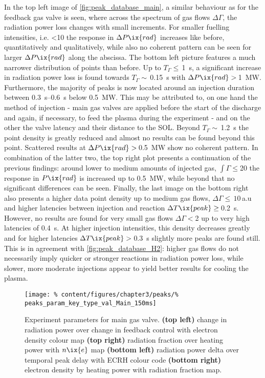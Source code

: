             In the top left image of \cref{fig:peak_database_main}, a similar behaviour as for the feedback gas valve is seen, where across the spectrum of gas flows $\Delta\Gamma$, the radiation power loss changes with small increments. For smaller fuelling intensities, i.e. <\SI{10}{\arbitraryunit} the response in $\Delta P\ix{rad}$ increases like before, quantitatively and qualitatively, while also no coherent pattern can be seen for larger $\Delta P\ix{rad}$ along the abscissa. The bottom left picture features a much narrower distribution of points than before. Up to $T_{\Gamma}\le\,$\SI{1}{\second}, a significant increase in radiation power loss is found towards $T_{\Gamma}\sim\,$\SI{0.15}{\second} with $\Delta P\ix{rad}>\,$\SI{1}{\mega\watt}. Furthermore, the majority of peaks is now located around an injection duration between \SIrange{0.3}{0.6}{\second} below \SI{0.5}{\mega\watt}. This may be attributed to, on one hand the method of injection - main gas valves are applied before the start of the discharge and again, if necessary, to feed the plasma during the experiment - and on the other the valve latency and their distance to the SOL. Beyond $T_{\Gamma}\sim\,$\SI{1.2}{\second} the point density is greatly reduced and almost no results can be found beyond this point. Scattered results at $\Delta P\ix{rad}>\,$\SI{0.5}{\mega\watt} show no coherent pattern. In combination of the latter two, the top right plot presents a continuation of the previous findings: around lower to medium amounts of injected gas, $\int\Gamma\le$\SI{20}{\arbitraryunit} the response in $P\ix{rad}$ is increased up to \SI{0.5}{\mega\watt}, while beyond that no significant differences can be seen. Finally, the last image on the bottom right also presents a higher data point density up to medium gas flows, $\Delta\Gamma\le\,10\,$a.u and higher latencies between injection and reaction $\Delta T\ix{peak}\ge\,$\SI{0.2}{\second}. However, no results are found for very small gas flows $\Delta\Gamma<$\SI{2}{\arbitraryunit} up to very high latencies of \SI{0.4}{\second}. At higher injection intensities, this density decreases greatly and for higher latencies $\Delta T\ix{peak}>\,$\SI{0.3}{\second} slightly more peaks are found still. This is in agreement with \cref{fig:peak_database_H2}: higher gas flows do not necessarily imply quicker or stronger reactions in radiation power loss, while slower, more moderate injections appear to yield better results for cooling the plasma.\\%
%
            \begin{figure}[t]%
                \centering%
                \texttt{[image: \%
                    content/figures/chapter3/peaks/\%
                    peaks\_param\_key\_type\_val\_Main\_150ms]}%
                \caption{Experiment parameters for main gas valve. \textbf{(top left)} change in radiation power over change in feedback control with electron density colour map \textbf{(top right)} radiation fraction over heating power with $n\ix{e}$ map \textbf{(bottom left)} radiation power delta over temporal peak delay with ECRH colour code \textbf{(bottom right)} electron density by heating power with radiation fraction map.}\label{fig:peak_parameters_Main}%
            \end{figure}%
